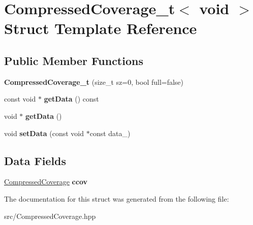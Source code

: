 \hypertarget{structCompressedCoverage__t_3_01void_01_4}{}\section{Compressed\+Coverage\+\_\+t$<$ void $>$ Struct Template Reference}
\label{structCompressedCoverage__t_3_01void_01_4}
\subsection*{Public Member Functions}
\begin{DoxyCompactItemize}
\item 
\mbox{\label{structCompressedCoverage__t_3_01void_01_4_a13eace0db5076cfe9bab6da443e57f65}} 
{\bfseries Compressed\+Coverage\+\_\+t} (size\+\_\+t sz=0, bool full=false)
\item 
\mbox{\label{structCompressedCoverage__t_3_01void_01_4_aa3042237eb821110bd679f8748c62552}} 
const void $\ast$ {\bfseries get\+Data} () const
\item 
\mbox{\label{structCompressedCoverage__t_3_01void_01_4_a0b06a86d5497c27a349120d72d34ddf3}} 
void $\ast$ {\bfseries get\+Data} ()
\item 
\mbox{\label{structCompressedCoverage__t_3_01void_01_4_abf8e69127ebd1422e7c365b596564fb5}} 
void {\bfseries set\+Data} (const void $\ast$const data\+\_\+)
\end{DoxyCompactItemize}
\subsection*{Data Fields}
\begin{DoxyCompactItemize}
\item 
\mbox{\label{structCompressedCoverage__t_3_01void_01_4_adad112b8bafd8817426583d9603ce884}} 
\hyperlink{classCompressedCoverage}{Compressed\+Coverage} {\bfseries ccov}
\end{DoxyCompactItemize}


The documentation for this struct was generated from the following file\+:\begin{DoxyCompactItemize}
\item 
src/Compressed\+Coverage.\+hpp\end{DoxyCompactItemize}
